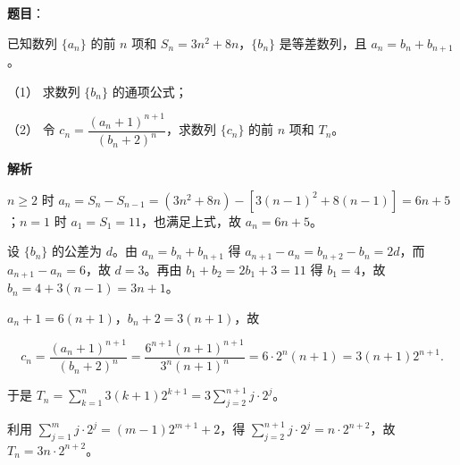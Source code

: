 \begin{answer}

\textbf{题目}：

已知数列 \(\{a_n\}\) 的前 \(n\) 项和 \(S_n=3n^2+8n\)，\(\{b_n\}\) 是等差数列，且 \(a_n=b_n+b_{n+1}\)。

（1） 求数列 \(\{b_n\}\) 的通项公式；

（2） 令 \(c_n=\dfrac{(a_n+1)^{n+1}}{(b_n+2)^n}\)，求数列 \(\{c_n\}\) 的前 \(n\) 项和 \(T_n\)。

\textbf{解析}


\(n\geqslant 2\) 时 \(a_{n}=S_{n}-S_{n-1}=(3n^{2}+8n)-\left[3(n-1)^{2}+8(n-1)\right]=6n+5\)；\(n=1\) 时 \(a_{1}=S_{1}=11\)，也满足上式，故 \(a_{n}=6n+5\)。

设 \(\{b_{n}\}\) 的公差为 \(d\)。由 \(a_{n}=b_{n}+b_{n+1}\) 得 \(a_{n+1}-a_{n}=b_{n+2}-b_{n}=2d\)，而 \(a_{n+1}-a_{n}=6\)，故 \(d=3\)。再由 \(b_{1}+b_{2}=2b_{1}+3=11\) 得 \(b_{1}=4\)，故 \(b_{n}=4+3(n-1)=3n+1\)。


\(a_{n}+1=6(n+1)\)，\(b_{n}+2=3(n+1)\)，故

\nopagebreak[4]
\[
c_{n}=\dfrac{(a_{n}+1)^{n+1}}{(b_{n}+2)^{n}}=\dfrac{6^{n+1}(n+1)^{n+1}}{3^{n}(n+1)^{n}}=6\cdot 2^{n}(n+1)=3(n+1)2^{n+1}.
\]

于是 \(T_{n}=\sum\limits_{k=1}^{n}3(k+1)2^{k+1}=3\sum\limits_{j=2}^{n+1}j\cdot 2^{j}\)。

利用 \(\sum\limits_{j=1}^{m}j\cdot 2^{j}=(m-1)2^{m+1}+2\)，得 \(\sum\limits_{j=2}^{n+1}j\cdot 2^{j}=n\cdot 2^{n+2}\)，故 \(T_{n}=3n\cdot 2^{n+2}\)。



\end{answer}
